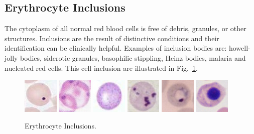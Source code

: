 \documentclass[final,a4paper,12pt,english]{UnicaPhdThesis3}
\begin{document}
\subsection{Erythrocyte Inclusions}
The cytoplasm of all normal red blood cells is free of debris, granules, or other structures. Inclusions are the result of distinctive conditions and their identification can be clinically helpful. Examples of inclusion bodies are: howell-jolly bodies, siderotic granules, basophilic stippling, Heinz bodies, malaria and nucleated red cells. This cell inclusion are illustrated in Fig.~\ref{fig:Inclusions}.

\begin{figure}[!htbp]
\centering
\includegraphics[width=0.15\textwidth]{images/Howell}
\includegraphics[width=0.15\textwidth]{images/siderotic}
\includegraphics[width=0.15\textwidth]{images/basophilic}
\includegraphics[width=0.15\textwidth]{images/Heinz}
\includegraphics[width=0.15\textwidth]{images/Malaria}
\includegraphics[width=0.15\textwidth]{images/nucleated}
\caption{\label{fig:Inclusions} Erythrocyte Inclusions.}
\end{figure}
\end{document}
